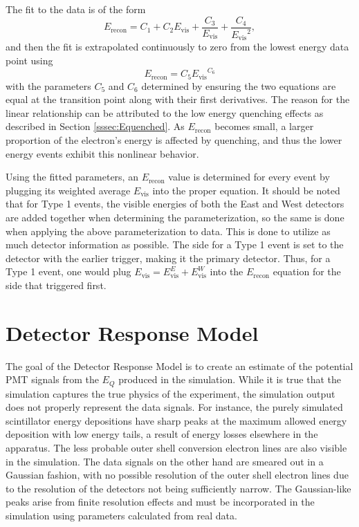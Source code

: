 The fit to the data is of the form
\begin{equation}
  E_{\mathrm{recon}} = C_1 + C_2E_{\mathrm{vis}} + \frac{C_3}{E_{\mathrm{vis}}} + \frac{C_4}{{E_{\mathrm{vis}}}^2},
\end{equation}
and then the fit is extrapolated continuously to zero from the lowest energy data point using
\begin{equation}
  E_{\mathrm{recon}} = C_5{E_{\mathrm{vis}}}^{C_6}
\end{equation}
with the parameters $C_5$ and $C_6$ determined by ensuring the two equations are equal at the
transition point along with their first derivatives. The reason for the linear relationship
can be attributed to the low energy quenching effects as described in Section \ref{sssec:Equenched}.
As $E_{\mathrm{recon}}$ becomes small, a larger proportion of the electron's energy is affected by quenching, and thus
the lower energy events exhibit this nonlinear behavior.

Using the fitted parameters, an $E_{\mathrm{recon}}$ value is determined
for every event by plugging its weighted average $E_{\mathrm{vis}}$ into the proper equation.
It should be noted that for Type 1 events, the visible energies of both the East and West
detectors are added together when determining the parameterization, so
the same is done when applying the above parameterization to data. This is done to utilize as much
detector information as possible. The side for a Type 1 event is set to
the detector with the earlier trigger, making it the primary detector.
Thus, for a Type 1
event, one would plug $E_{\mathrm{vis}} = E_{\mathrm{vis}}^E + E_{\mathrm{vis}}^W$ into the $E_{\mathrm{recon}}$
equation for the side that triggered first.

\section{Detector Response Model} \label{sec:DetectorResponseModel}
The goal of the Detector Response Model is to create an estimate of the potential PMT
signals from the $E_Q$ produced in the simulation. While it is true that the simulation
captures the true physics of the experiment, the simulation output does not properly
represent the data signals.
For instance, the purely simulated scintillator energy depositions have sharp peaks at the
maximum allowed energy deposition with low
energy tails, a result of energy losses elsewhere in the apparatus. The less probable outer shell
conversion electron lines are also visible in the simulation. The data signals
on the other hand are smeared out in a Gaussian fashion, with no possible
resolution of the outer shell electron lines due to the resolution of the detectors not
being sufficiently narrow.
The Gaussian-like peaks arise from finite resolution effects and
must be incorporated in the simulation using parameters calculated
from real data.  



